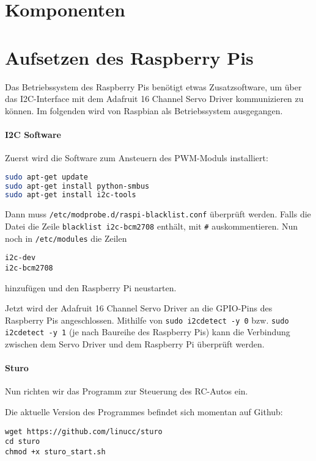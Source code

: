 \documentclass[a4paper,10pt]{scrartcl}
\begin{document}
\section{Komponenten}

\section{Aufsetzen des Raspberry Pis}

  Das Betriebssystem des Raspberry Pis benötigt etwas Zusatzsoftware, um über das I2C-Interface mit
  dem Adafruit 16 Channel Servo Driver kommunizieren zu können.
  Im folgenden wird von Raspbian als Betriebssystem ausgegangen.

  \paragraph{I2C Software} Zuerst wird die Software zum Ansteuern des PWM-Moduls installiert:
    \begin{lstlisting}[language=sh]
sudo apt-get update
sudo apt-get install python-smbus
sudo apt-get install i2c-tools
    \end{lstlisting}

    Dann muss \lstinline{/etc/modprobe.d/raspi-blacklist.conf} überprüft werden.
    Falls die Datei die Zeile \lstinline{blacklist i2c-bcm2708} enthält, mit \lstinline{#}
    auskommentieren.
    Nun noch in \lstinline{/etc/modules} die Zeilen
    \begin{lstlisting}
i2c-dev
i2c-bcm2708
    \end{lstlisting}

    hinzufügen und den Raspberry Pi neustarten.

    Jetzt wird der Adafruit 16 Channel Servo Driver an die GPIO-Pins des Raspberry Pis
    angeschlossen.
    Mithilfe von \lstinline{sudo i2cdetect -y 0} bzw. \lstinline{sudo i2cdetect -y 1} (je nach
    Baureihe des Raspberry Pis) kann die Verbindung zwischen dem Servo Driver und dem Raspberry Pi
    überprüft werden.

  \paragraph{Sturo} Nun richten wir das Programm zur Steuerung des RC-Autos ein.

    Die aktuelle Version des Programmes befindet sich momentan auf Github:

    \begin{lstlisting}
wget https://github.com/linucc/sturo
cd sturo
chmod +x sturo_start.sh
    \end{lstlisting}
\end{document}
